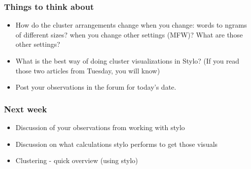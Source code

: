 \documentclass{beamer}
\begin{document}
\begin{frame}
\frametitle{Things to think about}
\begin{itemize}
\item How do the cluster arrangements change when you change: words to ngrams of different sizes? when you change other settings (MFW)? What are those other settings?
\item What is the best way of doing cluster visualizations in Stylo? (If you read those two articles from Tuesday, you will know)
\item Post your observations in the forum for today's date.
\end{itemize}
\end{frame}

\begin{frame}
\frametitle{Next week}
\begin{itemize}
\item Discussion of your observations from working with stylo
\item Discussion on what calculations stylo performs to get those visuals
\item Clustering - quick overview (using stylo)
\end{itemize}
\end{frame}
\end{document}
